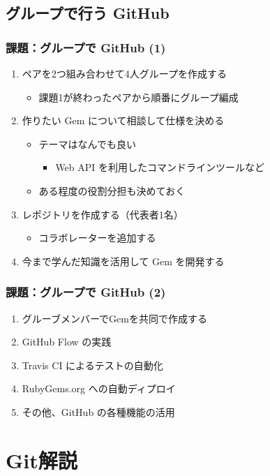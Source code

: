 \documentclass{bxjsarticle}
\begin{document}
\subsection{グループで行う GitHub}
\label{sec-4-2}
\subsubsection{課題：グループで GitHub (1)}
\label{sec-4-2-1}
\begin{enumerate}
\item ペアを2つ組み合わせて4人グループを作成する
\begin{itemize}
\item 課題1が終わったペアから順番にグループ編成
\end{itemize}
\item 作りたい Gem について相談して仕様を決める
\begin{itemize}
\item テーマはなんでも良い
\begin{itemize}
\item Web API を利用したコマンドラインツールなど
\end{itemize}
\item ある程度の役割分担も決めておく
\end{itemize}
\item レポジトリを作成する（代表者1名）
\begin{itemize}
\item コラボレーターを追加する
\end{itemize}
\item 今まで学んだ知識を活用して Gem を開発する
\end{enumerate}
\subsubsection{課題：グループで GitHub (2)}
\label{sec-4-2-2}
\begin{enumerate}
\item グルーブメンバーでGemを共同で作成する
\item GitHub Flow の実践
\item Travis CI によるテストの自動化
\item RubyGems.org への自動ディプロイ
\item その他、GitHub の各種機能の活用
\end{enumerate}

\section{Git解説}
\label{sec-5}
\end{document}
